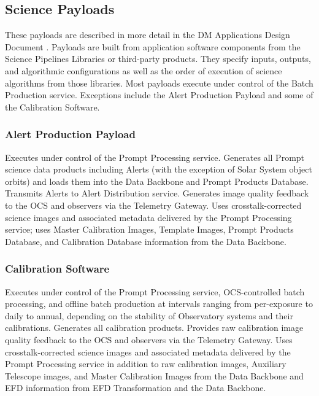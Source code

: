 \documentclass[DM,toc]{lsstdoc}
\begin{document}
\subsection{Science Payloads}\label{science-payloads}

These payloads are described in more detail in the DM Applications Design Document .
Payloads are built from application software components from the Science Pipelines Libraries or third-party products.
They specify inputs, outputs, and algorithmic configurations as well as the order of execution of science algorithms from those libraries.
Most payloads execute under control of the Batch Production service.
Exceptions include the Alert Production Payload and some of the Calibration Software.

\subsubsection{Alert Production Payload}\label{alert-production-payload}

Executes under control of the Prompt Processing service. Generates all
Prompt science data products including Alerts (with the exception of
Solar System object orbits) and loads them into the Data Backbone and
Prompt Products Database. Transmits Alerts to Alert Distribution service.
Generates image quality feedback to the OCS and observers via the
Telemetry Gateway. Uses crosstalk-corrected science images and
associated metadata delivered by the Prompt Processing service; uses
Master Calibration Images, Template Images, Prompt Products Database, and
Calibration Database information from the Data Backbone.

\subsubsection{Calibration Software}\label{calibration-software-payload}

Executes under control of the Prompt Processing service, OCS-controlled batch processing, and offline batch production at intervals ranging from per-exposure to daily to annual, depending on the stability of Observatory systems and their calibrations.
Generates all calibration products.
Provides raw calibration image quality feedback to the OCS and observers via the
Telemetry Gateway. Uses crosstalk-corrected science images and
associated metadata delivered by the Prompt Processing service in addition to raw calibration images, Auxiliary Telescope images, and Master
Calibration Images from the Data Backbone and EFD information from EFD Transformation and the Data Backbone.
\end{document}

